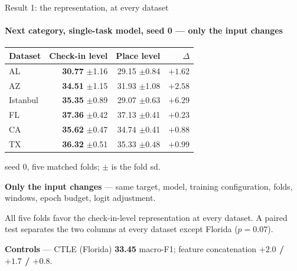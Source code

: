 \documentclass{beamer}
\begin{document}
\begin{frame}{Result 1: the representation, at every dataset}
    \framesubtitle{Next category, single-task model, seed 0 --- only the input changes}

    \begin{center}
        \small
        \setlength{\tabcolsep}{9pt}
        \renewcommand{\arraystretch}{1.0}
        \begin{tabular}{@{}lrrr@{}}
            \toprule
            \textbf{Dataset} & \textbf{Check-in level} & \textbf{Place level} & \textbf{$\Delta$} \\
            \midrule
            AL       & \textbf{30.77} $\pm$1.16 & 29.15 $\pm$0.84 & $+1.62$ \\
            AZ       & \textbf{34.51} $\pm$1.15 & 31.93 $\pm$1.08 & $+2.58$ \\
            Istanbul & \textbf{35.35} $\pm$0.89 & 29.07 $\pm$0.63 & $+6.29$ \\
            FL       & \textbf{37.36} $\pm$0.42 & 37.13 $\pm$0.41 & $+0.23$ \\
            CA       & \textbf{35.62} $\pm$0.47 & 34.74 $\pm$0.41 & $+0.88$ \\
            TX       & \textbf{36.32} $\pm$0.51 & 35.33 $\pm$0.48 & $+0.99$ \\
            \bottomrule
        \end{tabular}\par
        \smallskip
        {\footnotesize seed 0, five matched folds; $\pm$ is the fold sd.\par}
    \end{center}

    \medskip
    {\footnotesize
    \textbf{Only the input changes} --- same target, model, training configuration, folds,
    windows, epoch budget, logit adjustment.\par
    \smallskip
    All five folds favor the check-in-level representation at every dataset. A paired test
    separates the two columns at every dataset except Florida ($p = 0.07$).\par
    \textbf{Controls} --- CTLE (Florida) \textbf{33.45} macro-F1; feature concatenation
    \textbf{$+2.0$ / $+1.7$ / $+0.8$}.\par}
\end{frame}
\end{document}
